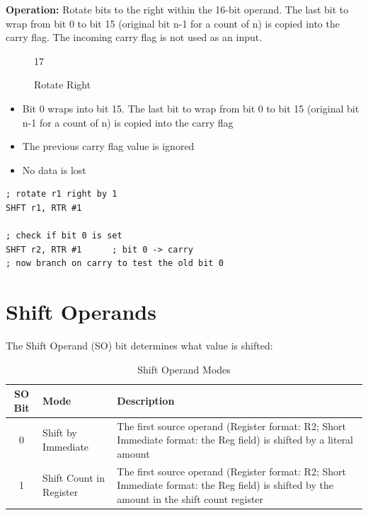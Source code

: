 \textbf{Operation:} Rotate bits to the right within the 16-bit operand. The last bit to wrap from bit 0 to bit 15 (original
bit n-1 for a count of n) is copied into the carry flag. The incoming carry flag is not used as an input.

\begin{figure}[H]
	\centering
	\begin{bytefield}[bitwidth=1.2em]{17}
		 \\
	\end{bytefield}
	\caption{Rotate Right}
\end{figure}

\begin{itemize}
	\item Bit 0 wraps into bit 15. The last bit to wrap from bit 0 to bit 15 (original bit n-1 for a count of n) is copied into
	      the carry flag
	\item The previous carry flag value is ignored
	\item No data is lost
\end{itemize}

\begin{example}
	\begin{lstlisting}
; rotate r1 right by 1
SHFT r1, RTR #1

; check if bit 0 is set
SHFT r2, RTR #1      ; bit 0 -> carry
; now branch on carry to test the old bit 0
	\end{lstlisting}
	\caption{Rotating a Value Right and Testing a Bit (RTR)}
\end{example}

\section{Shift Operands}

The Shift Operand (SO) bit determines what value is shifted:

\begin{table}[H]
	\centering
	\begin{tabular}{clp{8cm}}
		\toprule
		\textbf{SO Bit} & \textbf{Mode}           & \textbf{Description}                                                                                                                       \\
		\midrule
		0               & Shift by Immediate      & The first source operand (Register format: R2; Short Immediate format: the Reg field) is shifted by a literal amount                       \\
		1               & Shift Count in Register & The first source operand (Register format: R2; Short Immediate format: the Reg field) is shifted by the amount in the shift count register \\
		\bottomrule
	\end{tabular}
	\caption{Shift Operand Modes}
	\label{tab:shift-operand}
\end{table}

